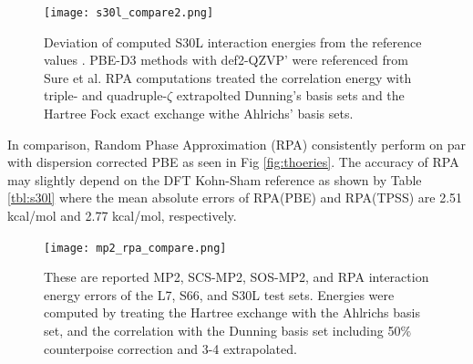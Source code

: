 \documentclass[twoside,twocolumn,9pt]{article}
\begin{document}
\begin{figure}[h]
  \centering
  \texttt{[image: s30l\_compare2.png]}
  \caption{Deviation of computed S30L interaction energies from
    the reference values \cite{Sure15JChemTheoryComput}.
    PBE-D3 methods with def2-QZVP' were referenced from Sure et
    al\cite{Sure15JChemTheoryComput}. RPA computations treated
    the correlation energy with triple- and quadruple-$\zeta$
    extrapolted Dunning's basis sets and the Hartree Fock exact
    exchange withe Ahlrichs' basis sets.}
  \label{fig:theories}
\end{figure}

In comparison, Random Phase Approximation (RPA) consistently perform
on par with dispersion corrected PBE as seen in Fig \ref{fig:thoeries}.
The accuracy of RPA may slightly depend on the DFT Kohn-Sham reference as shown
by Table \ref{tbl:s30l} where the mean absolute errors of RPA(PBE) and
RPA(TPSS) are 2.51 kcal/mol and 2.77 kcal/mol, respectively.

%

\begin{figure}
  \centering
  \texttt{[image: mp2\_rpa\_compare.png]}
  \caption{These are reported MP2, SCS-MP2, SOS-MP2, and RPA interaction
    energy errors of the L7, S66, and S30L test sets. Energies were
    computed by treating the Hartree exchange with the Ahlrichs basis
    set, and the correlation with the Dunning basis set including 50$\%$
    counterpoise correction and 3-4 extrapolated.}
  \label{fig:mp2_rpa_comp}
\end{figure}
\end{document}
